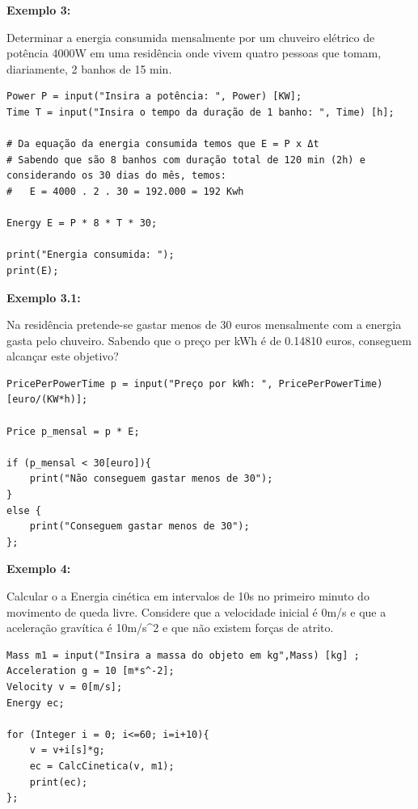 \documentclass[10pt,portuguese]{article}
\begin{document}
\par \textbf{Exemplo 3:}

\par Determinar a energia consumida mensalmente por um chuveiro elétrico de potência 4000W em uma residência onde vivem quatro pessoas que tomam, diariamente, 2 banhos de 15 min.

\begin{lstlisting}
Power P = input("Insira a potência: ", Power) [KW];
Time T = input("Insira o tempo da duração de 1 banho: ", Time) [h];

# Da equação da energia consumida temos que E = P x Δt
# Sabendo que são 8 banhos com duração total de 120 min (2h) e considerando os 30 dias do mês, temos:
#   E = 4000 . 2 . 30 = 192.000 = 192 Kwh

Energy E = P * 8 * T * 30;

print("Energia consumida: ");
print(E);
\end{lstlisting}

\par \textbf{Exemplo 3.1:}

\par Na residência pretende-se gastar menos de 30 euros mensalmente com a energia gasta pelo chuveiro. Sabendo que o preço per kWh é de 0.14810 euros, conseguem alcançar este objetivo?

\begin{lstlisting}
PricePerPowerTime p = input("Preço por kWh: ", PricePerPowerTime) [euro/(KW*h)];

Price p_mensal = p * E;

if (p_mensal < 30[euro]){
    print("Não conseguem gastar menos de 30");
}
else {
    print("Conseguem gastar menos de 30");
};
\end{lstlisting}

\clearpage

\par \textbf{Exemplo 4:}

\par Calcular o a Energia cinética em intervalos de 10s no primeiro minuto do movimento de queda livre. Considere que a velocidade inicial é 0m/s e que a aceleração gravítica é 10m/s\string^2 e que não existem forças de atrito.

\begin{lstlisting}
Mass m1 = input("Insira a massa do objeto em kg",Mass) [kg] ;
Acceleration g = 10 [m*s^-2];
Velocity v = 0[m/s];
Energy ec;

for (Integer i = 0; i<=60; i=i+10){
    v = v+i[s]*g;
    ec = CalcCinetica(v, m1);
    print(ec); 
};
\end{lstlisting}
\end{document}
